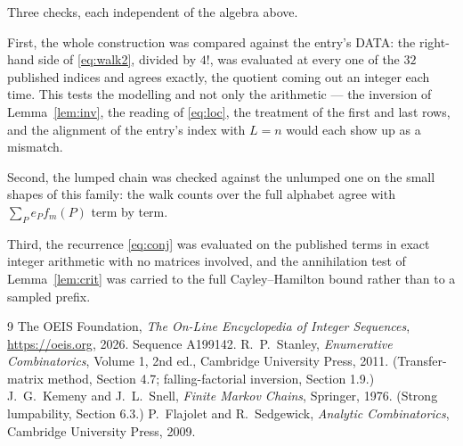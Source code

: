 \documentclass[11pt,a4paper]{article}
\theoremstyle{plain}
\theoremstyle{definition}
\begin{document}
Three checks, each independent of the algebra above.

First, the whole construction was compared against the entry's DATA: the right-hand side of
\eqref{eq:walk2}, divided by $4!$, was evaluated at every one of the $32$
published indices and agrees exactly, the quotient coming out an integer each time. This
tests the modelling and not only the arithmetic --- the inversion of Lemma~\ref{lem:inv},
the reading of \eqref{eq:loc}, the treatment of the first and last rows, and the
alignment of the entry's index with $L=n$ would each show up as a mismatch.

Second, the lumped chain was checked against the unlumped one on the small shapes of this
family: the walk counts over the full alphabet agree with $\sum_P e_Pf_m(P)$ term by term.

Third, the recurrence \eqref{eq:conj} was evaluated on the published terms in exact integer
arithmetic with no matrices involved, and the annihilation test of Lemma~\ref{lem:crit} was
carried to the full Cayley--Hamilton bound rather than to a sampled prefix.

\begin{thebibliography}{9}
 The OEIS Foundation, \emph{The On-Line Encyclopedia of Integer
Sequences}, \url{https://oeis.org}, 2026. Sequence A199142.
 R.~P.~Stanley, \emph{Enumerative Combinatorics}, Volume 1, 2nd ed.,
Cambridge University Press, 2011. (Transfer-matrix method, Section 4.7; falling-factorial
inversion, Section 1.9.)
 J.~G.~Kemeny and J.~L.~Snell, \emph{Finite Markov Chains}, Springer,
1976. (Strong lumpability, Section 6.3.)
 P.~Flajolet and R.~Sedgewick, \emph{Analytic Combinatorics}, Cambridge
University Press, 2009.
\end{thebibliography}
\end{document}
